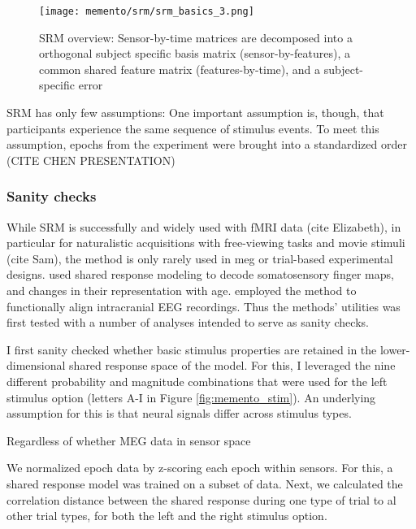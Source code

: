 \begin{figure}
	\centering
	\texttt{[image: memento/srm/srm\_basics\_3.png]}
	\caption[SRM overview]{SRM overview: Sensor-by-time matrices are decomposed into a orthogonal subject specific basis matrix (sensor-by-features), a common shared feature matrix (features-by-time), and a subject-specific error}
	\label{fig:srm-basics-multi}
\end{figure}

\gls{SRM} has only few assumptions: %
One important assumption is, though, that participants experience the same sequence of stimulus events.
To meet this assumption, epochs from the experiment were brought into a standardized order (CITE CHEN PRESENTATION)

\subsubsection{Sanity checks}

While \gls{SRM} is successfully and widely used with fMRI data (cite Elizabeth), in particular for naturalistic acquisitions with free-viewing tasks and movie stimuli (cite Sam), the method is only rarely used in \gls{meg} or trial-based experimental designs.
\citet{kalyani2023reduced} used shared response modeling to decode somatosensory finger maps, and changes in their representation with age.
\citet{xie2021minimal} employed the method to functionally align intracranial EEG recordings.
Thus the methods' utilities was first tested with a number of analyses intended to serve as sanity checks.




I first sanity checked whether basic stimulus properties are retained in the lower-dimensional shared response space of the model.
For this, I leveraged the nine different probability and magnitude combinations that were used for the left stimulus option (letters A-I in Figure \ref{fig:memento_stim}).
An underlying assumption for this is that neural signals differ across stimulus types.

Regardless of whether MEG data in sensor space



We normalized epoch data by z-scoring each epoch within sensors.
For this, a shared response model was trained on a subset of data.
Next, we calculated the correlation distance between the shared response during one type of trial to al other trial types, for both the left and the right stimulus option.


